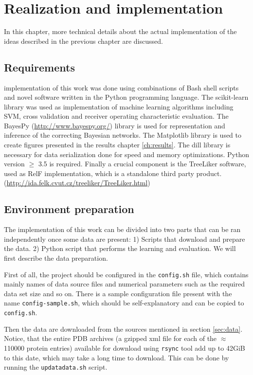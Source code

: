 \documentclass[11pt,twoside,a4paper]{book}
\begin{document}
\chapter{Realization and implementation}
\label{ch:realization}
In this chapter, more technical details about the actual implementation 
of the ideas described in the previous chapter are discussed.

\section{Requirements} implementation of this work was done using combinations of Bash shell scripts
and novel software written in the Python programming language.
The scikit-learn \cite{sklearn} library was used as 
implementation of machine learning algorithms including SVM, cross validation and receiver operating characteristic evaluation.
The BayesPy (\url{http://www.bayespy.org/}) library is used for representation and inference of 
the correcting Bayesian networks.
The Matplotlib library is used to create figures presented in the results chapter \ref{ch:results}.
The dill library is necessary for data serialization done for speed and memory optimizations.
Python version $\ge$ 3.5 is required.
Finally a crucial component is the TreeLiker software,
used as RelF implementation,
which is a standalone third party product. (\url{http://ida.felk.cvut.cz/treeliker/TreeLiker.html})


\section{Environment preparation} The implementation of this work can be divided into two parts that can be ran independently once some data are present:
1) Scripts that download and prepare the data.
2) Python script that performs the learning and evaluation.
We will first describe the data preparation.

First of all, the project should be configured in the \texttt{config.sh} file,
which contains mainly names of data source files and numerical parameters
such as the required data set size and so on.
There is a sample configuration file present with the name \texttt{config-sample.sh},
which should be self-explanatory and can be copied to \texttt{config.sh}.

Then the data are downloaded from the sources mentioned in section \ref{sec:data}.
Notice, that the entire PDB archives (a gzipped xml file for each of the $\approx$ 110000 protein entries)
available for download using \texttt{rsync} tool add up to 42GiB to this date,
which may take a long time to download.
This can be done by running the \texttt{updatadata.sh} script.
\end{document}
